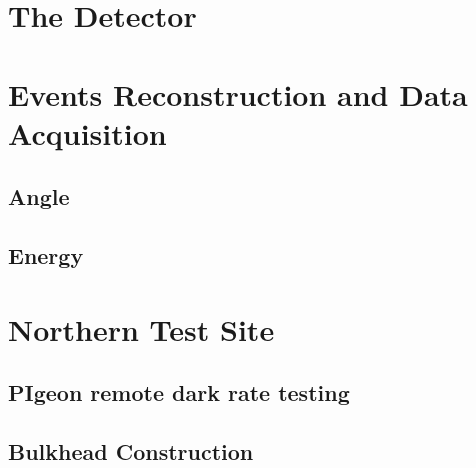 \section{The Detector}

\section{Events Reconstruction and Data Acquisition}

\subsection{Angle}

\subsection{Energy}

\section{Northern Test Site}

\subsection{PIgeon remote dark rate testing}

\subsection{Bulkhead Construction}
